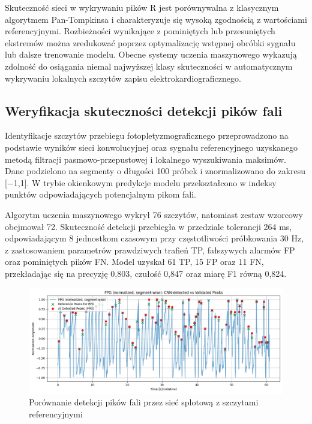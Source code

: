 \documentclass[journal]{IEEEtran}
\begin{document}
{\newpage
Skuteczność sieci w wykrywaniu pików R jest porównywalna z klasycznym algorytmem Pan-Tompkinsa i charakteryzuje się wysoką zgodnością z wartościami referencyjnymi. Rozbieżności wynikające z pominiętych lub przesuniętych ekstremów można zredukować poprzez optymalizację wstępnej obróbki sygnału lub dalsze trenowanie modelu. Obecne systemy uczenia maszynowego wykazują zdolność do osiągania niemal najwyższej klasy skuteczności w automatycznym wykrywaniu lokalnych szczytów zapisu elektrokardiograficznego.

\subsection{Weryfikacja skuteczności detekcji pików fali}
Identyfikacje szczytów przebiegu fotopletyzmograficznego przeprowadzono na podstawie wyników sieci konwolucyjnej oraz sygnału referencyjnego uzyskanego metodą filtracji pasmowo-przepustowej i lokalnego wyszukiwania maksimów. Dane podzielono na segmenty o długości 100 próbek i znormalizowano do zakresu [−1,1]. W trybie okienkowym predykcje modelu przekształcono w indeksy punktów odpowiadających potencjalnym pikom fali.

Algorytm uczenia maszynowego wykrył 76 szczytów, natomiast zestaw wzorcowy obejmował 72. Skuteczność detekcji przebiegła w przedziale tolerancji 264 ms, odpowiadającym 8 jednostkom czasowym przy częstotliwości próbkowania 30 Hz, z zastosowaniem parametrów prawdziwych trafień TP, fałszywych alarmów FP oraz pominiętych pików FN. Model uzyskał 61 TP, 15 FP oraz 11 FN, przekładając się na precyzję 0,803, czułość 0,847 oraz miarę F1 równą 0,824.

\begin{figure}[htbp]
    \centering
    \includegraphics[scale=0.28]{ppg_ai_vs_real.png}
    \caption{Porównanie detekcji pików fali przez sieć splotową z szczytami referencyjnymi}
    \label{fig:ppg_ai_real_peaks}
\end{figure}

}
\end{document}
